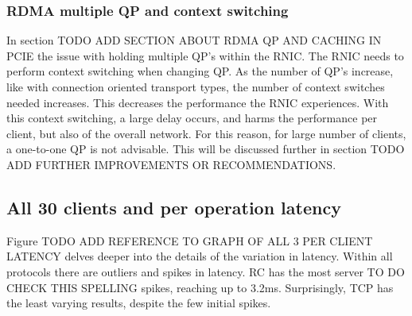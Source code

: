 \subsubsection{RDMA multiple QP and context switching}
In section TODO ADD SECTION ABOUT RDMA QP AND CACHING IN PCIE the issue with holding multiple QP's within the RNIC.
The RNIC needs to perform context switching when changing QP.
As the number of QP's increase, like with connection oriented transport types, the number of context switches needed increases.
This decreases the performance the RNIC experiences.
With this context switching, a large delay occurs, and harms the performance per client, but also of the overall network.
For this reason, for large number of clients, a one-to-one QP is not advisable.
This will be discussed further in section TODO ADD FURTHER IMPROVEMENTS OR RECOMMENDATIONS.

\subsection{All 30 clients and per operation latency}
Figure TODO ADD REFERENCE TO GRAPH OF ALL 3 PER CLIENT LATENCY delves deeper into the details of the variation in latency.
Within all protocols there are outliers and spikes in latency.
RC has the most server TO DO CHECK THIS SPELLING spikes, reaching up to 3.2ms.
Surprisingly, TCP has the least varying results, despite the few initial spikes.

